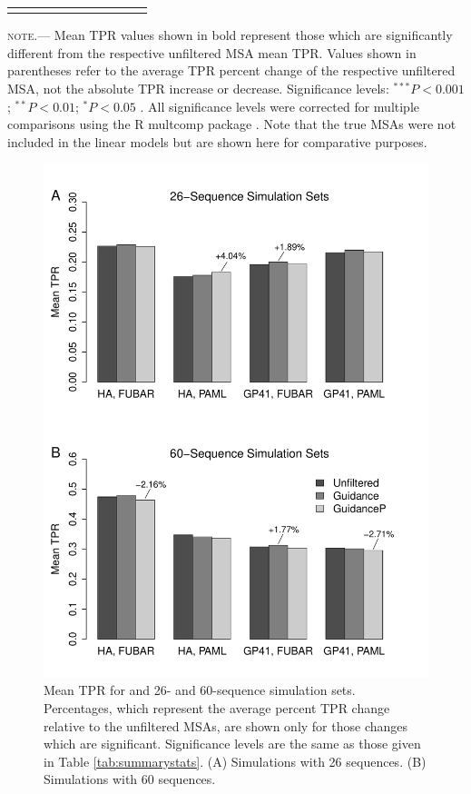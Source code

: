 \documentclass[11pt]{article}
\begin{document}
\begin{table}
\begin{adjustwidth}{-2cm}{}
\begin{tabular}{l l l c c c c c c c c}
\noalign{\smallskip}\hline\noalign{\smallskip}
\end{tabular}
\newline
\textsc{note.}--- Mean TPR values shown in bold represent those which are significantly different from the respective unfiltered MSA mean TPR. Values shown in parentheses refer to the average TPR percent change of the respective unfiltered MSA, not the absolute TPR increase or decrease. Significance levels:  $^{\ast\ast\ast} P < 0.001$; $^{\ast\ast} P < 0.01$; $^{\ast} P < 0.05$ . All significance levels were corrected for multiple comparisons using the R multcomp package \citep{Hothorn2008}. Note that the true MSAs were not included in the linear models but are shown here for comparative purposes.
\end{adjustwidth}
\end{table}

\begin{figure}[H]
\centerline{\includegraphics[width=4.75in]{Figures/barplot.pdf}}
\caption{\label{barplot} Mean TPR for and 26- and  60-sequence simulation sets. Percentages, which represent the average percent TPR change relative to the unfiltered MSAs, are shown only for those changes which are significant. Significance levels are the same as those given in Table \ref{tab:summarystats}. (A) Simulations with 26 sequences. (B) Simulations with 60 sequences.}
\end{figure}
\end{document}
